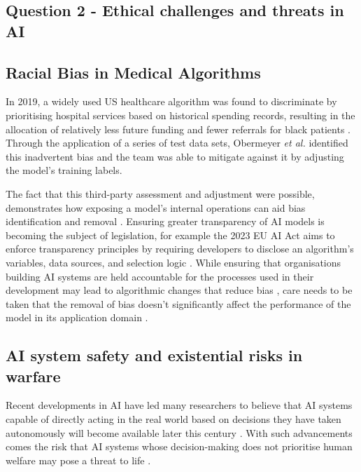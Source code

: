 \documentclass[a4paper, 11pt]{article}
\begin{document}
\begin{center}
\subsection*{Question 2 - Ethical challenges and threats in AI}
\end{center}

\subsection*{Racial Bias in Medical Algorithms}

In 2019, a widely used US healthcare algorithm was found to discriminate by prioritising hospital services 
based on historical spending records, resulting in the allocation of relatively less future funding and fewer referrals 
for black patients \cite{Jemielity2019, Ledford2019}. 
Through the application of a series of test data sets, Obermeyer \textit{et al.} \cite{Obermeyer2019} identified this inadvertent bias 
and the team was able to mitigate against it by adjusting the model’s training labels. 

The fact that this third-party assessment and adjustment were possible, demonstrates how exposing a model’s internal operations 
can aid bias identification and removal \cite{Seroussi2020, Winter2023}. 
Ensuring greater transparency of AI models is becoming the subject of legislation, 
for example the 2023 EU AI Act aims to enforce transparency principles by requiring developers to disclose an 
algorithm’s variables, data sources, and selection logic \cite{EuropeanParliament2023, Edwards2021}. 
While ensuring that organisations building AI systems are held accountable for the processes used in their development 
may lead to algorithmic changes that reduce bias \cite{Donovan2018, Lawry2020}, 
care needs to be taken that the removal of bias doesn't significantly affect the performance of the model 
in its application domain \cite{Kearns2020}.

\subsection*{AI system safety and existential risks in warfare}

Recent developments in AI have led many researchers to believe that AI systems capable of directly acting 
in the real world based on decisions they have taken autonomously will become available later this century \cite{Grace2018}. 
With such advancements comes the risk that AI systems whose decision-making does not prioritise human welfare 
may pose a threat to life \cite{Ord2020}. 
\end{document}
